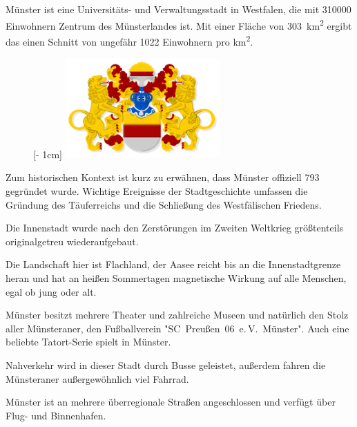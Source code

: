 \begin{multicols}{2}
Münster ist eine Universitäts- und Verwaltungsstadt in Westfalen, die mit \num{310000} Einwohnern Zentrum des Münsterlandes ist.
Mit einer Fläche von \SI{303}{\km\squared} ergibt das einen Schnitt von ungefähr \num{1022} Einwohnern pro \si{\km\squared}.

\setlength{\intextsep}{0cm}
{%
\setlength{\columnsep}{2mm}
\begin{figure}
	\raisebox{0pt}[\dimexpr\height - 1cm\relax]{%
		\includegraphics[width=5.9cm]{res/muenster_stadt_wappen.pdf}%
	}
\end{figure}
Zum historischen Kontext ist kurz zu erwähnen, dass Münster offiziell 793 gegründet wurde.
Wichtige Ereignisse der Stadtgeschichte umfassen die Gründung des Täuferreichs und die Schließung des Westfälischen Friedens.\par}

Die Innenstadt wurde nach den Zerstörungen im Zweiten Weltkrieg größtenteils originalgetreu wiederaufgebaut.

Die Landschaft hier ist Flachland, der Aasee reicht bis an die Innenstadtgrenze heran und hat an heißen Sommertagen magnetische Wirkung auf alle Menschen, egal ob jung oder alt.

Münster besitzt mehrere Theater und zahlreiche  Museen und natürlich den Stolz aller Münsteraner, den Fußballverein "SC~Preußen~06~e.\,V.~Münster".
Auch eine beliebte Tatort-Serie spielt in Münster.

Nahverkehr wird in dieser Stadt durch Busse geleistet, außerdem fahren die Münsteraner außergewöhnlich viel Fahrrad.

Münster ist an mehrere überregionale Straßen angeschlossen und verfügt über Flug- und Binnenhafen.


\end{multicols}
